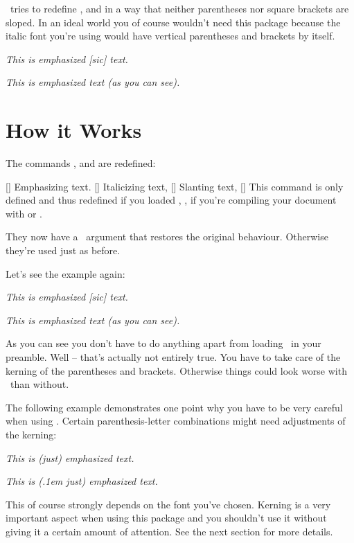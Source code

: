 \documentclass[load-preamble+]{cnltx-doc}
\begin{document}
\embrac\ tries to redefine ,  and
 in a way that neither parentheses nor
square brackets are sloped.  In an ideal world you of course wouldn't need
this package because the italic font you're using would have vertical
parentheses and brackets by itself.

\begin{example}
  \emph{This is emphasized [sic] text.} \par
  \emph{This is emphasized text (as you can see).}
\end{example}

\section{How it Works}
The commands ,  and  are redefined:
\begin{commands}
  [\sarg{}]
    Emphasizing text.
  [\sarg{}]
    Italicizing text,
  [\sarg{}]
    Slanting text,
  [\sarg{}]
    This command is only defined and thus redefined if you loaded
    , \ie, if you're compiling your document with \XeLaTeX{} or
    \LuaLaTeX.
\end{commands}
They now have a \sarg\ argument that restores the original behaviour.
Otherwise they're used just as before.

Let's see the example again:
\begin{example}
  \emph{This is emphasized [sic] text.} \par
  \emph{This is emphasized text (as you can see).}
\end{example}
As you can see you don't have to do anything apart from loading \embrac\ in
your preamble.  Well -- that's actually not entirely true.  You have to take
care of the kerning of the parentheses and brackets.  Otherwise things could
look worse with \embrac\ than without.

The following example demonstrates one point why you have to be very careful
when using \embrac.  Certain parenthesis-letter combinations might need
adjustments of the kerning:
\begin{example}
  \emph{This is (just) emphasized text.} \par
  \emph{This is (\kern.1em just) emphasized text.}
\end{example}
This of course strongly depends on the font you've chosen.  Kerning is a very
important aspect when using this package and you shouldn't use it without
giving it a certain amount of attention.  See the next section for more
details.
\end{document}
